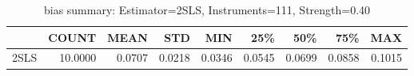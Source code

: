 \begin{table}[ht]
\centering
\caption{bias summary: Estimator=2SLS, Instruments=111, Strength=0.40}
\begin{tabular}{lrrrrrrrr}
\toprule
 & COUNT & MEAN & STD & MIN & 25\% & 50\% & 75\% & MAX \\
\midrule
2SLS & 10.0000 & 0.0707 & 0.0218 & 0.0346 & 0.0545 & 0.0699 & 0.0858 & 0.1015 \\
\bottomrule
\end{tabular}
\end{table}
